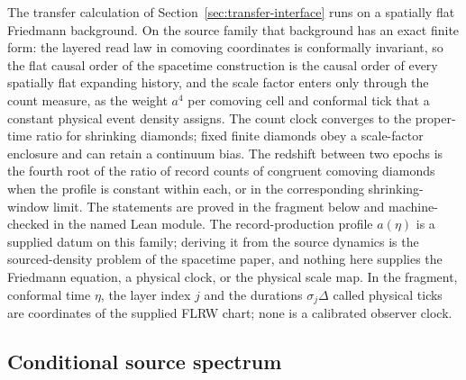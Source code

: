 \documentclass[11pt]{article}
\theoremstyle{remark}
\begin{document}
The transfer calculation of Section~\ref{sec:transfer-interface} runs on a
spatially flat Friedmann background. On the source family that background
has an exact finite form: the layered read law in comoving coordinates is
conformally invariant, so the flat causal order of the spacetime construction
is the causal order of every spatially flat expanding history, and the scale
factor enters only through the count measure, as the weight \(a^4\) per
comoving cell and conformal tick that a constant physical event density
assigns. The count clock converges to the proper-time ratio for shrinking
diamonds; fixed finite diamonds obey a scale-factor enclosure and can retain
a continuum bias. The redshift between two epochs is the fourth root of the
ratio of record counts of congruent comoving diamonds when the profile is
constant within each, or in the corresponding shrinking-window limit.
The statements are proved in the fragment below and machine-checked
in the named Lean module. The record-production profile \(a(\eta)\) is a
supplied datum on this family; deriving it from the source dynamics is the
sourced-density problem of the spacetime paper, and nothing here supplies the
Friedmann equation, a physical clock, or the physical scale map. In the
fragment, conformal time \(\eta\), the layer index \(j\) and the durations
\(\sigma_j\Delta\) called physical ticks are coordinates of the supplied
FLRW chart; none is a calibrated observer clock.



\subsection{Conditional source spectrum}
\end{document}
